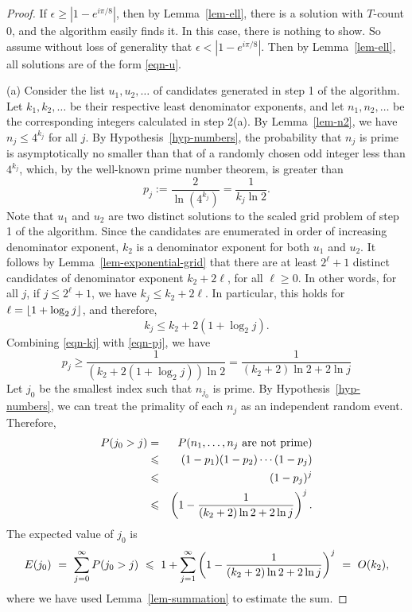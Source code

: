\documentclass{article}
\begin{document}
\begin{proof}
  If $\epsilon\geq|1-e^{i\pi/8}|$, then by Lemma~\ref{lem-ell}, there
  is a solution with $T$-count 0, and the algorithm easily finds
  it. In this case, there is nothing to show. So assume without loss
  of generality that $\epsilon<|1-e^{i\pi/8}|$. Then by
  Lemma~\ref{lem-ell}, all solutions are of the form {\eqref{eqn-u}}.

  (a) Consider the list $u_1,u_2,\ldots$ of candidates generated in
  step 1 of the algorithm. Let $k_1,k_2,\ldots$ be their respective
  least denominator exponents, and let $n_1,n_2,\ldots$ be the
  corresponding integers calculated in step 2(a). By
  Lemma~\ref{lem-n2}, we have $n_j\leq 4^{k_j}$ for all $j$. By
  Hypothesis~\ref{hyp-numbers}, the probability that $n_j$ is prime is
  asymptotically no smaller than that of a randomly chosen odd integer
  less than $4^{k_j}$, which, by the well-known prime number theorem,
  is greater than
  \begin{equation}\label{eqn-pj}
    p_j:=\frac{2}{\ln (4^{k_j})} = \frac{1}{k_j\ln 2}.
  \end{equation}
  Note that $u_1$ and $u_2$ are two distinct solutions to the scaled
  grid problem of step 1 of the algorithm. Since the candidates are
  enumerated in order of increasing denominator exponent, $k_2$ is a
  denominator exponent for both $u_1$ and $u_2$. It follows by
  Lemma~\ref{lem-exponential-grid} that there are at least $2^\ell+1$
  distinct candidates of denominator exponent $k_2+2\ell$, for all
  $\ell\geq 0$. In other words, for all $j$, if $j\leq 2^\ell+1$, we
  have $k_j\leq k_2+2\ell$. In particular, this holds for
  $\ell=\lfloor1+\log_2 j\rfloor$, and therefore, 
  \begin{equation}\label{eqn-kj}
    k_j\leq k_2+2(1+\log_2 j).
  \end{equation}
  Combining {\eqref{eqn-kj}} with {\eqref{eqn-pj}}, we have
  \begin{equation}\label{eqn-pj2}
    p_j \geq \frac{1}{(k_2+2(1+\log_2 j))\ln 2}
    = \frac{1}{(k_2+2)\ln 2 + 2\ln j}
  \end{equation}
  Let $j_0$ be the smallest index such that $n_{j_0}$ is prime.
  By Hypothesis~\ref{hyp-numbers}, we can treat the primality of each
  $n_j$ as an independent random event. Therefore, 
  \begin{eqnarray}
    P(j_0 > j) &=& P(\mbox{$n_1,\ldots,n_j$ are not prime})  \nonumber\\
    &\leqslant& (1-p_1)(1-p_2)\cdots(1-p_j) \nonumber\\
    &\leqslant& (1-p_j)^j \nonumber\\
    &\leqslant& \left(1-\frac{1}{(k_2+2)\ln 2 + 2\ln j}\right)^j. \nonumber
  \end{eqnarray}
  The expected value of $j_0$ is
  \begin{equation}\label{eqn-ej0}
    E(j_0) ~=~ \sum_{j=0}^{\infty} P(j_0 > j)
    ~\leqslant~ 1+\sum_{j=1}^{\infty} \left(1-\frac{1}{(k_2+2)\ln 2 + 2\ln
        j}\right)^j
    ~=~ O(k_2),
  \end{equation}
  where we have used Lemma~\ref{lem-summation} to estimate the sum.


\end{proof}
\end{document}
